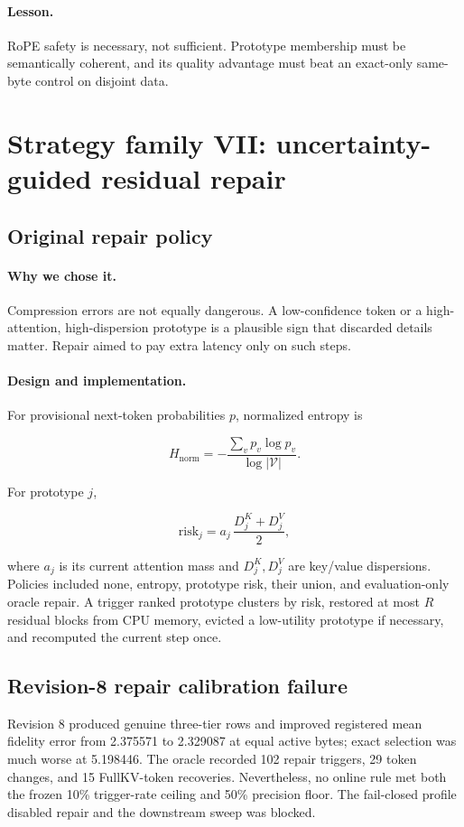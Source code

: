 \documentclass[11pt]{article}
\newcommand{\lesson}{\paragraph{Lesson.}}
\newcommand{\reason}{\paragraph{Why we chose it.}}
\newcommand{\design}{\paragraph{Design and implementation.}}
\begin{document}
\lesson
RoPE safety is necessary, not sufficient.  Prototype membership must be semantically coherent,
and its quality advantage must beat an exact-only same-byte control on disjoint data.

\section{Strategy family VII: uncertainty-guided residual repair}

\subsection{Original repair policy}

\reason
Compression errors are not equally dangerous.  A low-confidence token or a high-attention,
high-dispersion prototype is a plausible sign that discarded details matter.  Repair aimed to pay
extra latency only on such steps.

\design
For provisional next-token probabilities $p$, normalized entropy is

\begin{equation}
 H_{\mathrm{norm}}=-\frac{\sum_v p_v\log p_v}{\log |\mathcal{V}|}.
\end{equation}

For prototype $j$,

\begin{equation}
 \mathrm{risk}_j=a_j\,\frac{D^{K}_j+D^{V}_j}{2},
\end{equation}

where $a_j$ is its current attention mass and $D^K_j,D^V_j$ are key/value dispersions.  Policies
included none, entropy, prototype risk, their union, and evaluation-only oracle repair.  A trigger
ranked prototype clusters by risk, restored at most $R$ residual blocks from CPU memory, evicted a
low-utility prototype if necessary, and recomputed the current step once.

\subsection{Revision-8 repair calibration failure}

Revision 8 produced genuine three-tier rows and improved registered mean fidelity error from
2.375571 to 2.329087 at equal active bytes; exact selection was much worse at 5.198446.  The oracle
recorded 102 repair triggers, 29 token changes, and 15 FullKV-token recoveries.  Nevertheless, no
online rule met both the frozen 10\% trigger-rate ceiling and 50\% precision floor.  The fail-closed
profile disabled repair and the downstream sweep was blocked.
\end{document}

